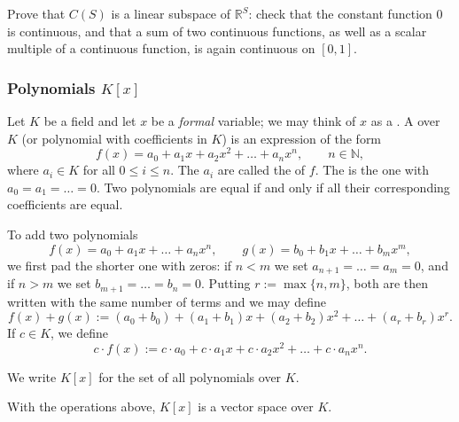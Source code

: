 \begin{exercise}
\label{exc:continuous_subspace}
Prove that $C(S)$ is a linear subspace of $\mathbb{R}^S$: check that the constant function $0$ is continuous, and that a sum of two continuous functions, as well as a scalar multiple of a continuous function, is again continuous on $[0,1]$.
\end{exercise}

\subsubsection{Polynomials \texorpdfstring{$K[x]$}{K[x]}}

\begin{example}
\label{ex:polynomial_space}
Let $K$ be a field and let $x$ be a \emph{formal} variable; we may think of $x$ as a . A  over $K$ (or polynomial with coefficients in $K$) is an expression of the form
\[
f(x) = a_0 + a_1 x + a_2 x^2 + \dots + a_n x^n, \qquad n \in \mathbb{N},
\]
where $a_i \in K$ for all $0 \le i \le n$. The $a_i$ are called the  of $f$. The  is the one with $a_0 = a_1 = \dots = 0$. Two polynomials are equal if and only if all their corresponding coefficients are equal.

To add two polynomials
\[
f(x) = a_0 + a_1 x + \dots + a_n x^n, \qquad g(x) = b_0 + b_1 x + \dots + b_m x^m,
\]
we first pad the shorter one with zeros: if $n < m$ we set $a_{n+1} = \dots = a_m = 0$, and if $n > m$ we set $b_{m+1} = \dots = b_n = 0$. Putting $r := \max\{n, m\}$, both are then written with the same number of terms and we may define
\[
f(x) + g(x) := (a_0 + b_0) + (a_1 + b_1)x + (a_2 + b_2)x^2 + \dots + (a_r + b_r)x^r.
\]
If $c \in K$, we define
\[
c \cdot f(x) := c \cdot a_0 + c \cdot a_1 x + c \cdot a_2 x^2 + \dots + c \cdot a_n x^n.
\]
\end{example}

\begin{notation}
\label{not:polynomial_ring}
We write $K[x]$ for the set of all polynomials over $K$.
\end{notation}

\begin{exercise}
\label{exc:polynomial_space_axioms}
With the operations above, $K[x]$ is a vector space over $K$.
\end{exercise}

